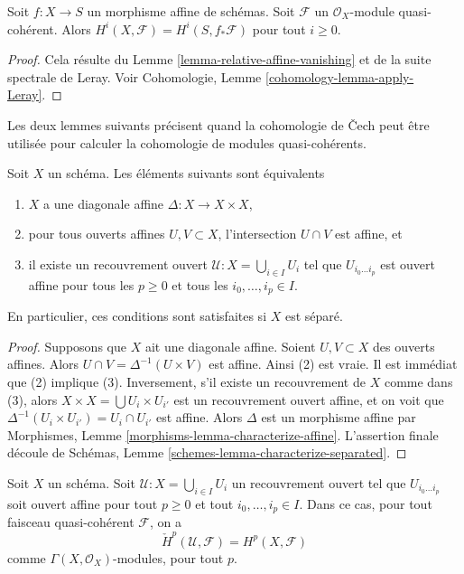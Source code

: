 \begin{lemma}
\label{lemma-relative-affine-cohomology}
Soit $f : X \to S$ un morphisme affine de schémas. Soit $\mathcal{F}$ un
$\mathcal{O}_X$-module quasi-cohérent. Alors
$H^i(X, \mathcal{F}) = H^i(S, f_*\mathcal{F})$ pour tout $i \geq 0$.
\end{lemma}

\begin{proof}
Cela résulte du Lemme \ref{lemma-relative-affine-vanishing} et de la suite spectrale
de Leray. Voir Cohomologie, Lemme \ref{cohomology-lemma-apply-Leray}.
\end{proof}

\noindent
Les deux lemmes suivants précisent quand la cohomologie de {\v C}ech peut être
utilisée pour calculer la cohomologie de modules quasi-cohérents.

\begin{lemma}
\label{lemma-affine-diagonal}
Soit $X$ un schéma. Les éléments suivants sont équivalents
\begin{enumerate}
\item $X$ a une diagonale affine $\Delta : X \to X \times X$, \item pour tous
ouverts affines $U, V \subset X$, l'intersection $U \cap V$ est affine, et
\item il existe un recouvrement ouvert $\mathcal{U} : X = \bigcup_{i \in I} U_i$ tel que $U_{i_0 \ldots i_p}$ est ouvert affine pour tous les $p \ge 0$ et
tous les $i_0, \ldots, i_p \in I$.
\end{enumerate}
En particulier, ces conditions sont satisfaites si $X$ est séparé.
\end{lemma}

\begin{proof}
Supposons que $X$ ait une diagonale affine. Soient $U, V \subset X$ des ouverts
affines. Alors $U \cap V = \Delta^{-1}(U \times V)$ est affine. Ainsi (2) est
vraie. Il est immédiat que (2) implique (3). Inversement, s'il existe un
recouvrement de $X$ comme dans (3), alors $X \times X = \bigcup U_i \times U_{i'}$ est un recouvrement ouvert affine, et on voit que $\Delta^{-1}(U_i \times U_{i'}) = U_i \cap U_{i'}$ est affine. Alors $\Delta$ est un morphisme
affine par Morphismes, Lemme \ref{morphisms-lemma-characterize-affine}.
L'assertion finale découle de Schémas, Lemme
\ref{schemes-lemma-characterize-separated}.
\end{proof}

\begin{lemma}
\label{lemma-cech-cohomology-quasi-coherent}
Soit $X$ un schéma. Soit $\mathcal{U} : X = \bigcup_{i \in I} U_i$ un
recouvrement ouvert tel que $U_{i_0 \ldots i_p}$ soit ouvert affine pour tout
$p \ge 0$ et tout $i_0, \ldots, i_p \in I$. Dans ce cas, pour tout faisceau
quasi-cohérent $\mathcal{F}$, on a
$$
\check{H}^p(\mathcal{U}, \mathcal{F}) = H^p(X, \mathcal{F})
$$
comme $\Gamma(X, \mathcal{O}_X)$-modules, pour tout $p$.
\end{lemma}

